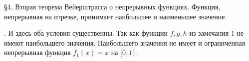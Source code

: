 \S4. \q Вторая теорема Вейерштрасса о непрерывных функциях. Функция, непрерывная на отрезке, принимает наибольшее и наименьшее значение.

. И здесь оба условия существенны. Так как функции $f, g, h$ из замечания 1 не имеют наибольшего значения. Наибольшего значения не имеет и ограниченная непрерывная функция $f_1(x) = x$ на $[0, 1)$.